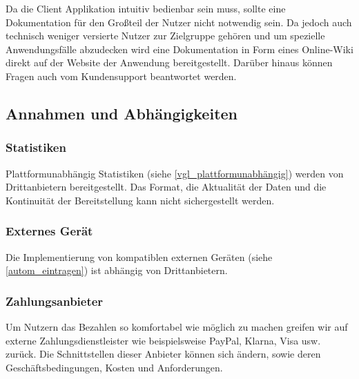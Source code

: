Da die Client Applikation intuitiv bedienbar sein muss, sollte eine Dokumentation für den Großteil der Nutzer nicht notwendig sein. Da jedoch auch technisch weniger versierte Nutzer zur Zielgruppe gehören und um spezielle Anwendungsfälle abzudecken wird eine Dokumentation in Form eines Online-Wiki direkt auf der Website der Anwendung bereitgestellt. Darüber hinaus können Fragen auch vom Kundensupport beantwortet werden.

\subsection{Annahmen und Abhängigkeiten}


\subsubsection{Statistiken}
Plattformunabhängig Statistiken (siehe \ref{vgl_plattformunabhängig}) werden von Drittanbietern bereitgestellt. Das Format, die Aktualität der Daten und die Kontinuität der Bereitstellung kann nicht sichergestellt werden.


\subsubsection{Externes Gerät}
Die Implementierung von kompatiblen externen Geräten (siehe \ref{autom_eintragen}) ist abhängig von Drittanbietern.

\subsubsection{Zahlungsanbieter}

Um Nutzern das Bezahlen so komfortabel wie möglich zu machen greifen wir auf externe Zahlungsdienstleister wie beispielsweise PayPal, Klarna, Visa usw. zurück. Die Schnittstellen dieser Anbieter können sich ändern, sowie deren Geschäftsbedingungen, Kosten und Anforderungen.
